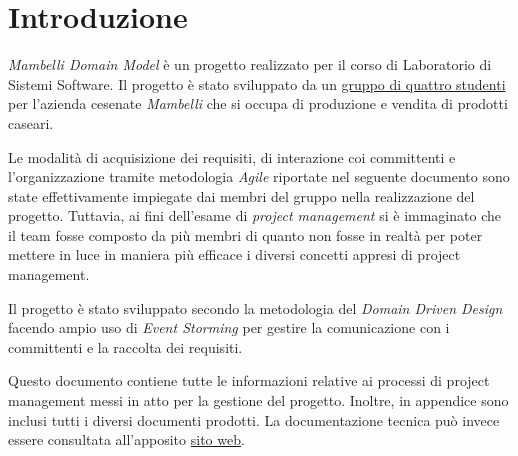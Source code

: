 \chapter*{Introduzione}

\emph{Mambelli Domain Model} è un progetto realizzato per il corso di Laboratorio di Sistemi Software.
Il progetto è stato sviluppato da un \href{https://atedeg.dev/about}{gruppo di quattro studenti} per l'azienda cesenate \emph{Mambelli} che si occupa di produzione e vendita di prodotti caseari.

Le modalità di acquisizione dei requisiti, di interazione coi committenti e l'organizzazione tramite metodologia \emph{Agile} riportate nel seguente documento sono state effettivamente impiegate dai membri del gruppo nella realizzazione del progetto. Tuttavia, ai fini dell'esame di \emph{project management} si è immaginato che il team fosse composto da più membri di quanto non fosse in realtà per poter mettere in luce in maniera più efficace i diversi concetti appresi di project management.

Il progetto è stato sviluppato secondo la metodologia del \emph{Domain Driven Design} facendo ampio uso di \emph{Event Storming} per gestire la comunicazione con i committenti e la raccolta dei requisiti.

Questo documento contiene tutte le informazioni relative ai processi di project management messi in atto per la gestione del progetto. Inoltre, in appendice sono inclusi tutti i diversi documenti prodotti.
La documentazione tecnica può invece essere consultata all'apposito \href{https://atedeg.dev/mdm}{sito web}.
